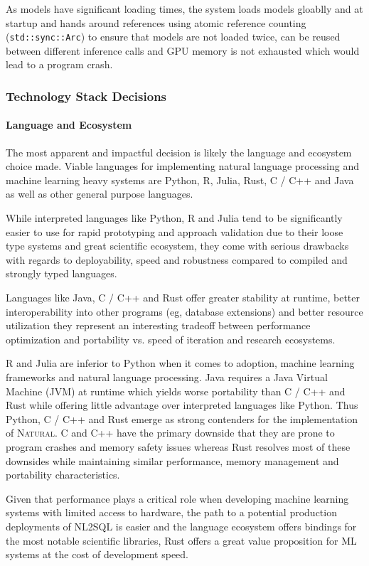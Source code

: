 As models have significant loading times, the system loads models gloablly and 
at startup and hands around references using atomic reference counting
(\texttt{std::sync::Arc}) to ensure that models are not loaded twice, can be
reused between different inference calls and GPU memory is not exhausted which
would lead to a program crash.

\subsubsection{Technology Stack Decisions}

\paragraph{Language and Ecosystem}

The most apparent and impactful decision is likely the language and ecosystem
choice made. Viable languages for implementing natural language processing and
machine learning heavy systems are Python, R, Julia, Rust, C / C++ and Java as
well as other general purpose languages.

While interpreted languages like Python, R and Julia tend to be significantly
easier to use for rapid prototyping and approach validation due to their loose
type systems and great scientific ecosystem, they come with serious drawbacks
with regards to deployability, speed and robustness compared to compiled and
strongly typed languages.

Languages like Java, C / C++ and Rust offer greater stability at runtime,
better interoperability into other programs (eg, database extensions) and better
resource utilization they represent an interesting tradeoff between performance
optimization and portability vs. speed of iteration and research ecosystems.

R and Julia are inferior to Python when it comes to adoption, machine learning
frameworks and natural language processing. Java requires a Java Virtual
Machine (JVM) at runtime which yields worse portability than C / C++ and Rust
while offering little advantage over interpreted languages like Python. Thus
Python, C / C++ and Rust emerge as strong contenders for the implementation of
\textsc{Natural}. C and C++ have the primary downside that they are prone to
program crashes and memory safety issues whereas Rust resolves most of these
downsides while maintaining similar performance, memory management and
portability characteristics.

Given that performance plays a critical role when developing machine learning
systems with limited access to hardware, the path to a potential production
deployments of NL2SQL is easier and the language ecosystem offers bindings
for the most notable scientific libraries, Rust offers a great value
proposition for ML systems at the cost of development speed.

